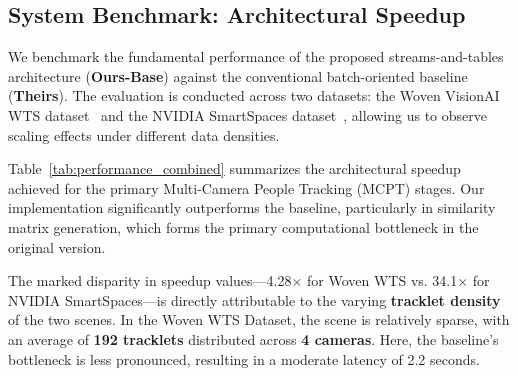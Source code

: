 \documentclass[11pt]{article}
\begin{document}
\subsection{System Benchmark: Architectural Speedup}

We benchmark the fundamental performance of the proposed streams-and-tables architecture (\textbf{Ours-Base}) against the conventional batch-oriented baseline (\textbf{Theirs}). The evaluation is conducted across two datasets: the Woven VisionAI WTS dataset~\cite{kong2024wts} and the NVIDIA SmartSpaces dataset~\cite{aicity2025track1}, allowing us to observe scaling effects under different data densities.

Table~\ref{tab:performance_combined} summarizes the architectural speedup achieved for the primary Multi-Camera People Tracking (MCPT) stages. Our implementation significantly outperforms the baseline, particularly in similarity matrix generation, which forms the primary computational bottleneck in the original version.

\begin{table}[H]
    \centering
    \caption{Architectural Speedup (\textbf{Theirs} vs. \textbf{Ours-Base}) for Woven WTS and NVIDIA SmartSpaces Datasets (Average Latency per Window over a 50-window stress test).}
    \label{tab:performance_combined}
\end{table}

The marked disparity in speedup values---4.28$\times$ for Woven WTS vs. 34.1$\times$ for NVIDIA SmartSpaces---is directly attributable to the varying \textbf{tracklet density} of the two scenes. In the Woven WTS Dataset, the scene is relatively sparse, with an average of \textbf{192 tracklets} distributed across \textbf{4 cameras}. Here, the baseline's bottleneck is less pronounced, resulting in a moderate latency of 2.2 seconds. 
\end{document}
